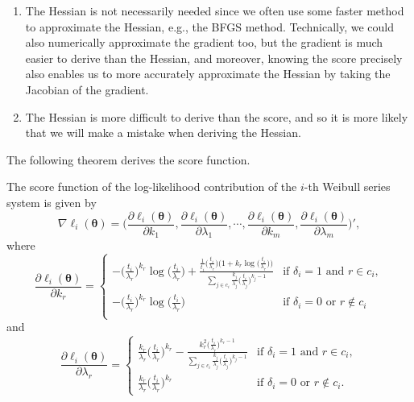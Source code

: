 \documentclass[
]{article}
\begin{document}
\begin{enumerate}
\def\labelenumi{\arabic{enumi}.}
\item
  The Hessian is not necessarily needed since we often use some faster
  method to approximate the Hessian, e.g., the BFGS method. Technically,
  we could also numerically approximate the gradient too, but the
  gradient is much easier to derive than the Hessian, and moreover,
  knowing the score precisely also enables us to more accurately
  approximate the Hessian by taking the Jacobian of the gradient.
\item
  The Hessian is more difficult to derive than the score, and so it is
  more likely that we will make a mistake when deriving the Hessian.
\end{enumerate}

The following theorem derives the score function.

\begin{theorem}
\label{thm:weibull_score}
The score function of the log-likelihood contribution of the $i$-th Weibull series
system is given by
\begin{equation}
\label{eq:weibull_score}
\nabla \ell_i(\boldsymbol{\theta}) = \biggl(
    \frac{\partial \ell_i(\boldsymbol{\theta})}{\partial k_1},
    \frac{\partial \ell_i(\boldsymbol{\theta})}{\partial \lambda_1},
    \cdots, 
    \frac{\partial \ell_i(\boldsymbol{\theta})}{\partial k_m},
    \frac{\partial \ell_i(\boldsymbol{\theta})}{\partial \lambda_m} \biggr)',
\end{equation}
where
\begin{equation}
\frac{\partial \ell_i(\boldsymbol{\theta})}{\partial k_r} = 
\begin{cases}
    -\bigl(\frac{t_i}{\lambda_r}\bigr)^{k_r}       
        \log\bigl(\frac{t_i}{\lambda_r}\bigr) +
        \frac{\frac{1}{t_i} \bigl(\frac{t_i}{\lambda_r}\bigr)
            \bigl(1+ k_r \log\bigl(\frac{t_i}{\lambda_r}\bigr)\bigr)}
            {\sum_{j \in c_i} \frac{k_j}{\lambda_j}\bigl(\frac{t_i}{\lambda_j}\bigr)^{k_j-1}}
            & \text{if } \delta_i = 1 \text{ and } r \in c_i,\\
    -\bigl(\frac{t_i}{\lambda_r}\bigr)^{k_r}\log\bigl(\frac{t_i}{\lambda_r}\bigr)
    & \text{if } \delta_i = 0 \text{ or } r \notin c_i\\
\end{cases}
\end{equation}
and 
\begin{equation}
\frac{\partial \ell_i(\boldsymbol{\theta})}{\partial \lambda_r} = 
\begin{cases}
    \frac{k_r}{\lambda_r} \bigl(\frac{t_i}{\lambda_r}\bigr)^{k_r} -
    \frac{k_r^2 \bigl(\frac{t_i}{\lambda_r}\bigr)^{k_r-1}}
        {\sum_{j \in c_i} \frac{k_j}{\lambda_j}\bigl(\frac{t_i}{\lambda_j}\bigr)^{k_j-1}}
    & \text{if } \delta_i = 1 \text{ and } r \in c_i,\\
    \frac{k_r}{\lambda_r} \bigl(\frac{t_i}{\lambda_r}\bigr)^{k_r}
    & \text{if } \delta_i = 0 \text{ or } r \notin c_i.
\end{cases}
\end{equation}
\end{theorem}
\end{document}
